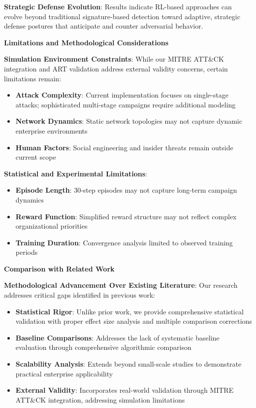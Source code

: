 \documentclass[12pt]{article}
\theoremstyle{definition}
\theoremstyle{plain}
\begin{document}
\textbf{Strategic Defense Evolution}: Results indicate RL-based approaches can evolve beyond traditional signature-based detection toward adaptive, strategic defense postures that anticipate and counter adversarial behavior.

\textbf{Limitations and Methodological Considerations}

\textbf{Simulation Environment Constraints}:
While our MITRE ATT\&CK integration and ART validation address external validity concerns, certain limitations remain:
\begin{itemize}
    \item \textbf{Attack Complexity}: Current implementation focuses on single-stage attacks; sophisticated multi-stage campaigns require additional modeling
    \item \textbf{Network Dynamics}: Static network topologies may not capture dynamic enterprise environments
    \item \textbf{Human Factors}: Social engineering and insider threats remain outside current scope
\end{itemize}

\textbf{Statistical and Experimental Limitations}:
\begin{itemize}
    \item \textbf{Episode Length}: 30-step episodes may not capture long-term campaign dynamics
    \item \textbf{Reward Function}: Simplified reward structure may not reflect complex organizational priorities
    \item \textbf{Training Duration}: Convergence analysis limited to observed training periods
\end{itemize}

\textbf{Comparison with Related Work}

\textbf{Methodological Advancement Over Existing Literature}:
Our research addresses critical gaps identified in previous work:
\begin{itemize}
    \item \textbf{Statistical Rigor}: Unlike prior work, we provide comprehensive statistical validation with proper effect size analysis and multiple comparison corrections
    \item \textbf{Baseline Comparisons}: Addresses the lack of systematic baseline evaluation through comprehensive algorithmic comparison
    \item \textbf{Scalability Analysis}: Extends beyond small-scale studies to demonstrate practical enterprise applicability
    \item \textbf{External Validity}: Incorporates real-world validation through MITRE ATT\&CK integration, addressing simulation limitations
\end{itemize}
\end{document}
